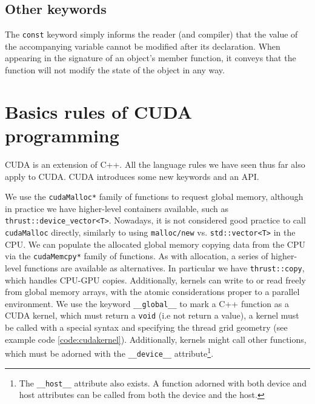 \documentclass[twoside,openright,titlepage,numbers=noenddot,%
headinclude,footinclude,cleardoublepage=empty,abstract=on,
BCOR=5mm,fontsize=11pt, dvipsnames, paper=b5
]{scrreprt}
\def\ucpp{uammd_cpp_lexer.py:UAMMDCppLexer -x}
\newcommand{\gpu}{\gls{GPU}\xspace}
\begin{document}
\subsection*{Other keywords}
The \texttt{const} keyword simply informs the reader (and compiler) that the value of the accompanying variable cannot be modified after its declaration. When appearing in the signature of an object's member function, it conveys that the function will not modify the state of the object in any way.

\section{Basics rules of CUDA programming}
CUDA is an extension of C++. All the language rules we have seen thus far also apply to CUDA. CUDA introduces some new keywords and an \gls{API}.

We use the \texttt{cudaMalloc*} family of functions to request global memory, although in practice we have higher-level containers available, such as \texttt{thrust::device_vector<T>}. Nowadays, it is not considered good practice to call \texttt{cudaMalloc} directly, similarly to using \texttt{malloc/new} vs. \texttt{std::vector<T>} in the CPU.
We can populate the allocated global memory copying data from the CPU via the \texttt{cudaMemcpy*} family of functions. As with allocation, a series of higher-level functions are available as alternatives. In particular we have \texttt{thrust::copy}, which handles CPU-\gpu copies. Additionally, kernels can write to or read freely from global memory arrays, with the atomic considerations proper to a parallel environment.
We use the keyword \texttt{__global__} to mark a C++ function as a CUDA kernel, which must return a \texttt{void} (i.e not return a value), a kernel must be called with a special syntax and specifying the thread grid geometry (see example code \ref{code:cudakernel}).
Additionally, kernels might call other functions, which must be adorned with the \texttt{__device__} attribute\footnote{The \texttt{__host__} attribute also exists. A function adorned with both device and host attributes can be called from both the device and the host.}.
\end{document}
